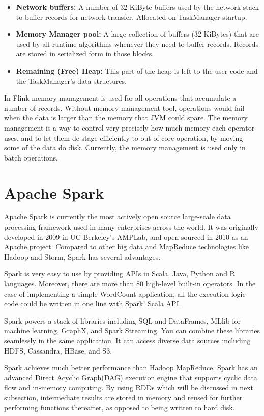\begin{itemize}
\item \textbf{Network buffers:} A number of 32 KiByte buffers used by the network stack to buffer records for network transfer. Allocated on TaskManager startup. 
\item \textbf{Memory Manager pool:} A large collection of buffers (32 KiBytes) that are used by all runtime algorithms whenever they need to buffer records. Records are stored in serialized form in those blocks.
\item \textbf{Remaining (Free) Heap:} This part of the heap is left to the user code and the TaskManager's data structures.
\end{itemize}
 
In Flink memory management is used for all operations that accumulate a number of records. Without memory management tool, operations would fail when the data is larger than the memory that JVM could spare. The memory management is a way to control very precisely how much memory each operator uses, and to let them de-stage efficiently to out-of-core operation, by moving some of the data do disk. Currently, the memory management is used only in batch operations. 

\section{Apache Spark}
\label{section:spark}

Apache Spark is currently the most actively open source large-scale data processing framework used in many enterprises across the world. It was originally developed in 2009 in UC Berkeley's AMPLab, and open sourced in 2010 as an Apache project. Compared to other big data and MapReduce technologies like Hadoop and Storm, Spark has several advantages. 

Spark is very easy to use by providing APIs in Scala, Java, Python and R languages. Moreover, there are more than 80 high-level built-in operators.  In the case of implementing a simple WordCount application, all the execution logic code could be written in one line with Spark' Scala API.

Spark powers a stack of libraries including SQL and DataFrames, MLlib for machine learning, GraphX, and Spark Streaming. You can combine these libraries seamlessly in the same application. It can access diverse data sources including HDFS, Cassandra, HBase, and S3.

Spark achieves much better performance than Hadoop MapReduce. Spark has an advanced Direct Acyclic Graph(DAG) execution engine that supports cyclic data flow and in-memory computing. By using RDDs which will be discussed in next subsection, intermediate results are stored in memory and reused for further performing functions thereafter, as opposed to being written to hard disk. 

